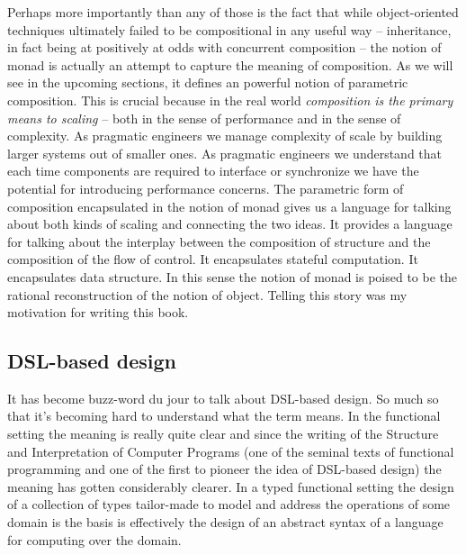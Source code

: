 Perhaps more importantly than any of those is the fact that while
object-oriented techniques ultimately failed to be compositional in
any useful way -- inheritance, in fact being at positively at odds
with concurrent composition -- the notion of monad is actually an
attempt to capture the meaning of composition. As we will see in the
upcoming sections, it defines an powerful notion of parametric
composition. This is crucial because in the real world
\emph{composition is the primary means to scaling} -- both in the
sense of performance and in the sense of complexity. As pragmatic
engineers we manage complexity of scale by building larger systems out
of smaller ones. As pragmatic engineers we understand that each time
components are required to interface or synchronize we have the
potential for introducing performance concerns. The parametric form of
composition encapsulated in the notion of monad gives us a language
for talking about both kinds of scaling and connecting the two
ideas. It provides a language for talking about the interplay between
the composition of structure and the composition of the flow of
control. It encapsulates stateful computation. It encapsulates data
structure. In this sense the notion of monad is poised to be the
rational reconstruction of the notion of object. Telling this story
was my motivation for writing this book.

\subsection{DSL-based design}

It has become buzz-word du jour to talk about DSL-based design. So
much so that it's becoming hard to understand what the term means. In
the functional setting the meaning is really quite clear and since the
writing of the Structure and Interpretation of Computer Programs (one
of the seminal texts of functional programming and one of the first to
pioneer the idea of DSL-based design) the meaning has gotten
considerably clearer. In a typed functional setting the design of a
collection of types tailor-made to model and address the operations of
some domain is the basis is effectively the design of an abstract
syntax of a language for computing over the domain.

